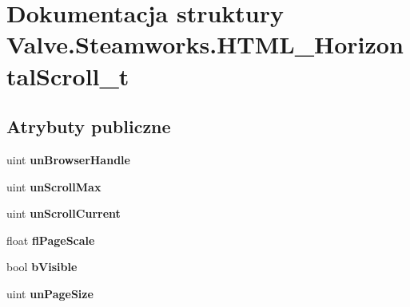 \hypertarget{struct_valve_1_1_steamworks_1_1_h_t_m_l___horizontal_scroll__t}{}\section{Dokumentacja struktury Valve.\+Steamworks.\+H\+T\+M\+L\+\_\+\+Horizontal\+Scroll\+\_\+t}
\label{struct_valve_1_1_steamworks_1_1_h_t_m_l___horizontal_scroll__t}
\subsection*{Atrybuty publiczne}
\begin{DoxyCompactItemize}
\item 
\mbox{\label{struct_valve_1_1_steamworks_1_1_h_t_m_l___horizontal_scroll__t_a1a1c34dfe3408af700b1ead45ba89178}} 
uint {\bfseries un\+Browser\+Handle}
\item 
\mbox{\label{struct_valve_1_1_steamworks_1_1_h_t_m_l___horizontal_scroll__t_aa33e63c3a3e3c41b46e7ad492fbcfcee}} 
uint {\bfseries un\+Scroll\+Max}
\item 
\mbox{\label{struct_valve_1_1_steamworks_1_1_h_t_m_l___horizontal_scroll__t_a52dc22722ad696f65c888e7917a6e1b1}} 
uint {\bfseries un\+Scroll\+Current}
\item 
\mbox{\label{struct_valve_1_1_steamworks_1_1_h_t_m_l___horizontal_scroll__t_a25241a213fc7640406e8faf0f78be936}} 
float {\bfseries fl\+Page\+Scale}
\item 
\mbox{\label{struct_valve_1_1_steamworks_1_1_h_t_m_l___horizontal_scroll__t_a4b460e906e372f618482efbc3c74bb8a}} 
bool {\bfseries b\+Visible}
\item 
\mbox{\label{struct_valve_1_1_steamworks_1_1_h_t_m_l___horizontal_scroll__t_aad4aa707fccb1308b1109d8886d73d56}} 
uint {\bfseries un\+Page\+Size}
\end{DoxyCompactItemize}


